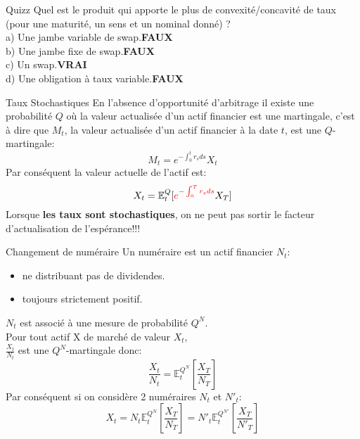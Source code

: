 \documentclass{beamer}
\begin{document}
\begin{frame}{Quizz}
Quel est le produit qui apporte le plus de convexité/concavité de taux (pour une maturité, un sens et un nominal donné) ?\\
\vspace{0.5cm}
a) Une jambe variable de swap.\textbf{\color{red}FAUX}\\
b) Une jambe fixe de swap.\textbf{\color{red}FAUX}\\
c) Un swap.\textbf{\color{green}VRAI}\\
d) Une obligation à taux variable.\textbf{\color{red}FAUX}\\
\end{frame}

\begin{frame}{Taux Stochastiques}
En l'absence d'opportunité d'arbitrage il existe une probabilité $Q$ où la valeur actualisée d'un actif financier est une martingale, c'est à dire que $M_t$, la valeur actualisée d'un actif financier à la date $t$, est une $Q$-martingale:
\[
	M_t = e^{-\int_0^t r_s ds}X_t
\]
Par conséquent la valeur actuelle de l'actif est:
\[
	X_t=\mathbb{E}^Q_t[\color{red} e^{-\int_0^T r_sds} \color{black} X_T]
\]
Lorsque \color{red}\textbf{les taux sont stochastiques}\color{black}, on ne peut pas sortir le facteur d'actualisation de l'espérance!!!
\end{frame}

\begin{frame}{Changement de numéraire}
Un numéraire est un actif financier $N_t$:
\begin{itemize}
\item ne distribuant pas de dividendes.
\item toujours strictement positif.
\end{itemize}
\vspace{0.5cm}
$N_t$ est associé à une mesure de probabilité $Q^N$.\\
\vspace{0.5cm}
Pour tout actif X de marché de valeur $X_t$,\\
 $\frac{X_t}{N_t}$ est une $Q^N$-martingale donc:
\[
\frac{X_t}{N_t}=\mathbb{E}^{Q^N}_t\left[\frac{X_T}{N_T}\right]
\]
\vspace{0.5cm}
Par conséquent si on considère 2 numéraires $N_t$ et $N'_t$:\\
\[
X_t=N_t\mathbb{E}^{Q^N}_t\left[\frac{X_T}{N_T}\right]=N'_t\mathbb{E}^{Q^{N'}}_t\left[\frac{X_T}{N'_T}\right]
\]
\end{frame}
\end{document}
